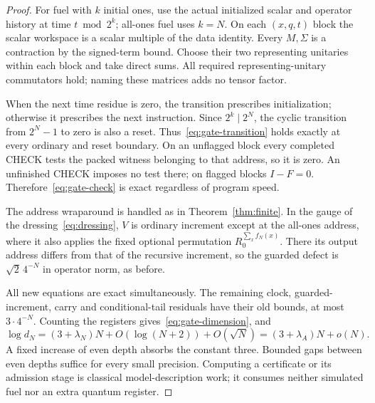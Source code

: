\begin{proof}
For fuel with $k$ initial ones, use the actual initialized scalar and operator history at time $t\bmod2^k$; all-ones fuel uses $k=N$. On each $(x,q,t)$ block the scalar workspace is a scalar multiple of the data identity. Every $M,\Sigma$ is a contraction by the signed-term bound. Choose their two representing unitaries within each block and take direct sums. All required representing-unitary commutators hold; naming these matrices adds no tensor factor.

When the next time residue is zero, the transition prescribes initialization; otherwise it prescribes the next instruction. Since $2^k\mid2^N$, the cyclic transition from $2^N-1$ to zero is also a reset. Thus~\eqref{eq:gate-transition} holds exactly at every ordinary and reset boundary. On an unflagged block every completed CHECK tests the packed witness belonging to that address, so it is zero. An unfinished CHECK imposes no test there; on flagged blocks $I-F=0$. Therefore~\eqref{eq:gate-check} is exact regardless of program speed.

The address wraparound is handled as in Theorem~\ref{thm:finite}. In the gauge of the dressing~\eqref{eq:dressing}, $V$ is ordinary increment except at the all-ones address, where it also applies the fixed optional permutation $R_0^{\sum_xf_N(x)}$. There its output address differs from that of the recursive increment, so the guarded defect is $\sqrt2\,4^{-N}$ in operator norm, as before.

All new equations are exact simultaneously. The remaining clock, guarded-increment, carry and conditional-tail residuals have their old bounds, at most $3\cdot4^{-N}$. Counting the registers gives~\eqref{eq:gate-dimension}, and
\[
 \log d_N=(3+\lambda_N)N+O(\log(N+2))+O(\sqrt N)
          =(3+\lambda_A)N+o(N).
\]
A fixed increase of even depth absorbs the constant three. Bounded gaps between even depths suffice for every small precision. Computing a certificate or its admission stage is classical model-description work; it consumes neither simulated fuel nor an extra quantum register.
\end{proof}


